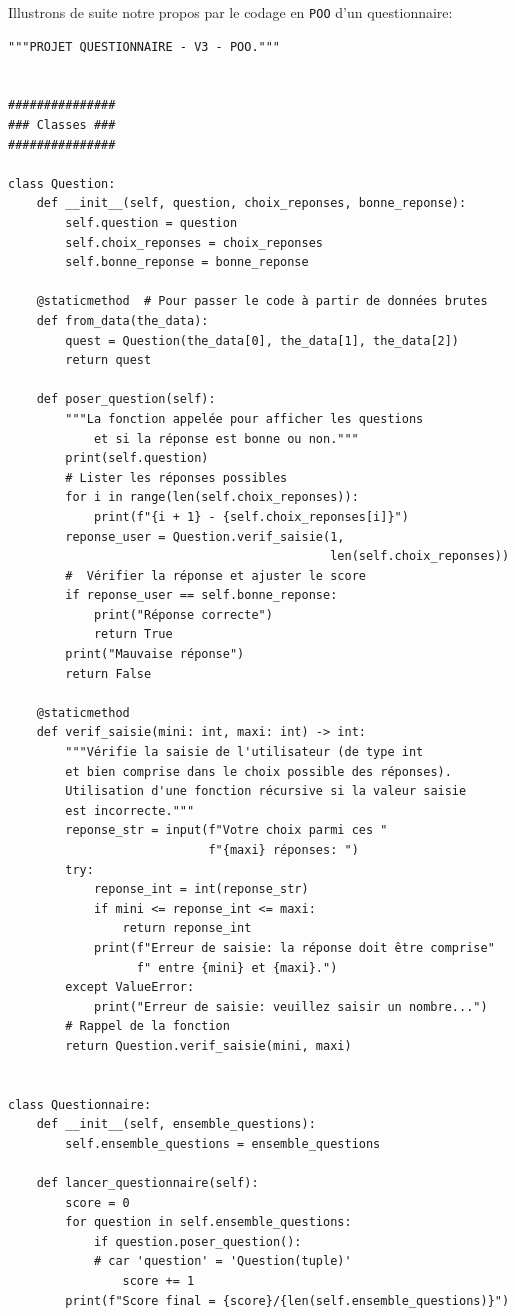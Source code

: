 \documentclass[a4paper,12pt]{book}
\begin{document}
Illustrons de suite notre propos par le codage en \texttt{POO} d'un questionnaire:
\begin{lstlisting}
"""PROJET QUESTIONNAIRE - V3 - POO."""


###############
### Classes ###
###############

class Question:
    def __init__(self, question, choix_reponses, bonne_reponse):
        self.question = question
        self.choix_reponses = choix_reponses
        self.bonne_reponse = bonne_reponse

    @staticmethod  # Pour passer le code à partir de données brutes
    def from_data(the_data):
        quest = Question(the_data[0], the_data[1], the_data[2])
        return quest

    def poser_question(self):
        """La fonction appelée pour afficher les questions
            et si la réponse est bonne ou non."""
        print(self.question)
        # Lister les réponses possibles
        for i in range(len(self.choix_reponses)):  
            print(f"{i + 1} - {self.choix_reponses[i]}")
        reponse_user = Question.verif_saisie(1,
                                             len(self.choix_reponses))
        #  Vérifier la réponse et ajuster le score
        if reponse_user == self.bonne_reponse:
            print("Réponse correcte")
            return True
        print("Mauvaise réponse")
        return False

    @staticmethod
    def verif_saisie(mini: int, maxi: int) -> int:
        """Vérifie la saisie de l'utilisateur (de type int
        et bien comprise dans le choix possible des réponses).
        Utilisation d'une fonction récursive si la valeur saisie
        est incorrecte."""
        reponse_str = input(f"Votre choix parmi ces "
                            f"{maxi} réponses: ")
        try:
            reponse_int = int(reponse_str)
            if mini <= reponse_int <= maxi:
                return reponse_int
            print(f"Erreur de saisie: la réponse doit être comprise"
                  f" entre {mini} et {maxi}.")
        except ValueError:
            print("Erreur de saisie: veuillez saisir un nombre...")
        # Rappel de la fonction
        return Question.verif_saisie(mini, maxi)  


class Questionnaire:
    def __init__(self, ensemble_questions):
        self.ensemble_questions = ensemble_questions

    def lancer_questionnaire(self):
        score = 0
        for question in self.ensemble_questions:
            if question.poser_question():  
            # car 'question' = 'Question(tuple)'
                score += 1
        print(f"Score final = {score}/{len(self.ensemble_questions)}")



\end{lstlisting}
\end{document}
